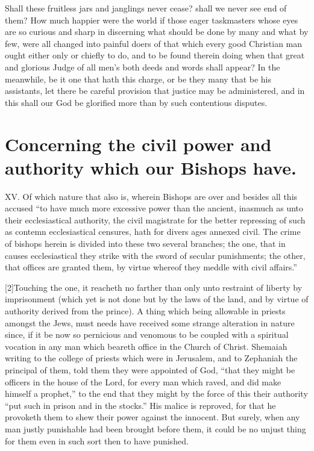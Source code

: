 Shall these fruitless jars and janglings never cease? shall we never see end of them? How much happier were the world if those eager taskmasters whose eyes are so curious and sharp in discerning what should be done by many and what by few, were all changed into painful doers of that which every good Christian man ought either only or chiefly to do, and to be found therein doing when that great and glorious Judge of all men’s both deeds and words shall appear? In the meanwhile, be it one that hath this charge, or be they many that be his assistants, let there be careful provision that justice may be administered, and in this shall our God be glorified more than by such contentious disputes.

\section*{Concerning the civil power and authority which our Bishops have.}

XV. Of which nature that also is, wherein Bishops are over and besides all this accused “to have much more excessive power than the ancient, inasmuch as unto their ecclesiastical authority, the civil magistrate for the better repressing of such as contemn ecclesiastical censures,
hath for divers ages annexed civil. The crime of bishops herein is divided into these two several branches; the one, that in causes ecclesiastical they strike with the sword of secular punishments; the other, that offices are granted them, by virtue whereof they meddle with civil affairs.”

[2]Touching the one, it reacheth no farther than only unto restraint of liberty by imprisonment (which yet is not done but by the laws of the land, and by virtue of authority derived from the prince). A thing which being allowable in priests amongst the Jews, must needs have received some strange alteration in nature since, if it be now so pernicious and venomous to be coupled with a spiritual vocation in any man which beareth office in the Church of Christ. Shemaiah writing to the college of priests which were in Jerusalem, and to Zephaniah the principal of them, told them they were appointed of God, “that they might be officers in the house of the Lord, for every man which raved, and did make himself a prophet,” to the end that they might by the force of this their authority “put such in prison and in the stocks.” His malice is reproved, for that he provoketh them to shew their power against the innocent. But surely, when any man justly punishable had been brought before them, it could be no unjust thing for them even in such sort then to have punished.

